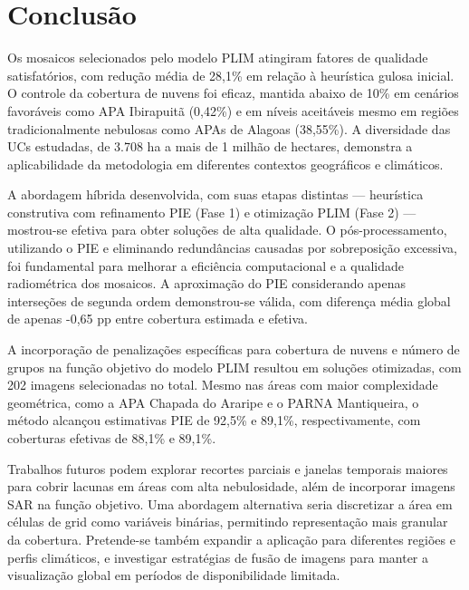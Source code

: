 \documentclass[a4paper,11pt]{article}
\begin{document}
\section{Conclusão}

Os mosaicos selecionados pelo modelo PLIM atingiram fatores de qualidade satisfatórios, com redução média de 28,1\% em relação à heurística gulosa inicial. O controle da cobertura de nuvens foi eficaz, mantida abaixo de 10\% em cenários favoráveis como APA Ibirapuitã (0,42\%) e em níveis aceitáveis mesmo em regiões tradicionalmente nebulosas como APAs de Alagoas (38,55\%). A diversidade das UCs estudadas, de 3.708 ha a mais de 1 milhão de hectares, demonstra a aplicabilidade da metodologia em diferentes contextos geográficos e climáticos.

A abordagem híbrida desenvolvida, com suas etapas distintas --- heurística construtiva com refinamento PIE (Fase 1) e otimização PLIM (Fase 2) --- mostrou-se efetiva para obter soluções de alta qualidade. O pós-processamento, utilizando o PIE e eliminando redundâncias causadas por sobreposição excessiva, foi fundamental para melhorar a eficiência computacional e a qualidade radiométrica dos mosaicos. A aproximação do PIE considerando apenas interseções de segunda ordem demonstrou-se válida, com diferença média global de apenas -0,65 pp entre cobertura estimada e efetiva.

A incorporação de penalizações específicas para cobertura de nuvens e número de grupos na função objetivo do modelo PLIM resultou em soluções otimizadas, com 202 imagens selecionadas no total. Mesmo nas áreas com maior complexidade geométrica, como a APA Chapada do Araripe e o PARNA Mantiqueira, o método alcançou estimativas PIE de 92,5\% e 89,1\%, respectivamente, com coberturas efetivas de 88,1\% e 89,1\%.

Trabalhos futuros podem explorar recortes parciais e janelas temporais maiores para cobrir lacunas em áreas com alta nebulosidade, além de incorporar imagens SAR na função objetivo. Uma abordagem alternativa seria discretizar a área em células de grid como variáveis binárias, permitindo representação mais granular da cobertura. Pretende-se também expandir a aplicação para diferentes regiões e perfis climáticos, e investigar estratégias de fusão de imagens para manter a visualização global em períodos de disponibilidade limitada.
\end{document}
